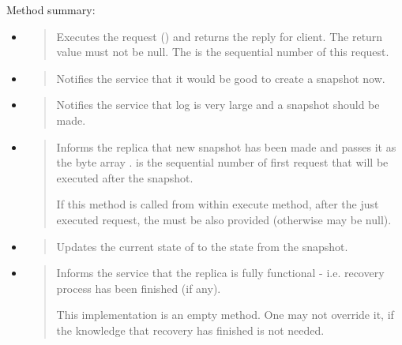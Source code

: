 Method summary:
\begin{itemize}
\item {} 
\begin{quote}

Executes the request () and returns the reply for client. The return value must not be null. The  is the sequential number of this request.
\end{quote}

\item {} 
\begin{quote}

Notifies the service that it would be good to create a snapshot now.
\end{quote}

\item {} 
\begin{quote}

Notifies the service that log is very large and a snapshot should be made.
\end{quote}

\item {} 
\begin{quote}

Informs the replica that new snapshot has been made and passes it as the byte array .  is the sequential number of first request that will be executed after the snapshot.

If this method is called from within execute method, after the just executed request, the  must be also provided (otherwise may be null).
\end{quote}

\item {} 
\begin{quote}

Updates the current state of  to the state from the snapshot.
\end{quote}

\item {} 
\begin{quote}

Informs the service that the replica is fully functional - i.e. recovery process has been finished (if any).

This implementation is an empty method. One may not override it, if the knowledge that recovery has finished is not needed.
\end{quote}

\end{itemize}


